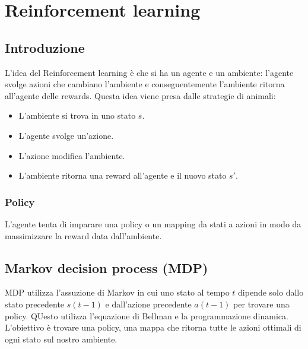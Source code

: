 \chapter{Reinforcement learning}

\section{Introduzione}
L'idea del Reinforcement learning \`e che si ha un agente e un ambiente: l'agente svolge azioni che cambiano l'ambiente e conseguentemente l'ambiente ritorna all'agente delle rewards.
Questa idea viene presa dalle strategie di animali:
\begin{itemize}
	\item L'ambiente si trova in uno stato $s$.
	\item L'agente svolge un'azione.
	\item L'azione modifica l'ambiente.
	\item L'ambiente ritorna una reward all'agente e il nuovo stato $s'$.
\end{itemize}

	\subsection{Policy}
	L'agente tenta di imparare una policy o un mapping da stati a azioni in modo da massimizzare la reward data dall'ambiente.

\section{Markov decision process (MDP)}
MDP utilizza l'assuzione di Markov in cui uno stato al tempo $t$ dipende solo dallo stato precedente $s(t-1)$ e dall'azione precedente $a(t-1)$ per trovare una policy.
QUesto utilizza l'equazione di Bellman e la programmazione dinamica.
L'obiettivo \`e trovare una policy, una mappa che ritorna tutte le azioni ottimali di ogni stato sul nostro ambiente.

